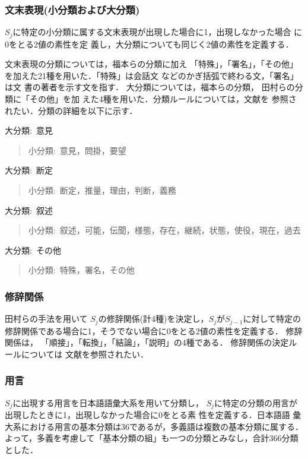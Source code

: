 \subsubsection*{文末表現(小分類および大分類)\cite{article3,article6}}

$S_j$に特定の小分類に属する文末表現が出現した場合に1，出現しなかった場合
に0をとる2値の素性を定
義し，大分類についても同じく2値の素性を定義する．

文末表現の分類については，福本らの分類\cite{article30}に加え
「特殊」，「署名」，「その他」を加えた21種を用いた．「特殊」は会話文
などのかぎ括弧で終わる文，「署名」は文
書の著者を示す文を指す．
大分類については，福本らの分類\cite{article30}，
田村らの分類\cite{article31}に「その他」を加
えた4種を用いた．分類ルールについては，文献\cite{article30,article31}を
参照されたい．分類の詳細を以下に示す．

大分類:~意見
\begin{quote}
 小分類:~意見，問掛，要望
\end{quote}

大分類:~断定
\begin{quote}
 小分類:~断定，推量，理由，判断，義務
\end{quote}

大分類:~叙述
\begin{quote}
 小分類:~叙述，可能，伝聞，様態，存在，継続，状態，使役，現在，過去
\end{quote}

大分類:~その他
\begin{quote}
 小分類:~特殊，署名，その他
\end{quote}

\subsubsection*{修辞関係\cite{article34}}

田村らの手法\cite{article31}を用いて
$S_j$の修辞関係(計4種)を決定し，$S_j$が$S_{j-1}$に対して特定の
修辞関係である場合に1，そうでない場合に0をとる2値の素性を定義する．
修辞関係は，
「順接」，「転換」，「結論」，「説明」の4種である．
修辞関係の決定ルールについては
文献\cite{article30,article31}を参照されたい．

\subsubsection*{用言}

$S_j$に出現する用言を日本語語彙大系\cite{article18}を用いて分類し，
$S_j$に特定の分類の用言が出現したときに1，出現しなかった場合に0をとる素
性を定義する．日本語語
彙大系における用言の基本分類は36であるが，多義語は複数の基本分類に属する．
よって，多義を考慮して「基本分類の組」も一つの分類とみなし，合計366分類
とした．

